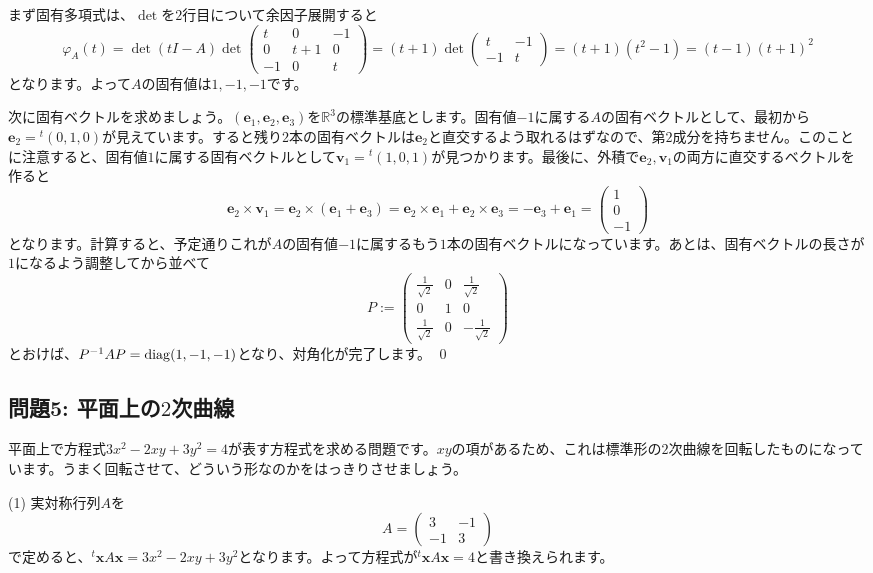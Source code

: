 まず固有多項式は、$\det$を$2$行目について余因子展開すると
\[
\varphi_A(t) = \det(tI - A)
\det
\begin{pmatrix}
t & 0 & -1 \\
0 & t + 1 & 0 \\
-1 & 0 & t 
\end{pmatrix}
=
(t + 1)
\det
\begin{pmatrix}
t & -1 \\
-1 & t 
\end{pmatrix}
= (t + 1)(t^2 - 1)
= (t - 1)(t + 1)^2
\]
となります。よって$A$の固有値は$1, -1, -1$です。

次に固有ベクトルを求めましょう。$(\bm{e}_1, \bm{e}_2, \bm{e}_3)$を$\mathbb{R}^3$の標準基底とします。固有値$-1$に属する$A$の固有ベクトルとして、最初から$\bm{e}_2 = {}^t(0, 1, 0)$が見えています。すると残り$2$本の固有ベクトルは$\bm{e}_2$と直交するよう取れるはずなので、第$2$成分を持ちません。このことに注意すると、固有値$1$に属する固有ベクトルとして$\bm{v}_1 = {}^t(1, 0, 1)$が見つかります。最後に、外積で$\bm{e}_2, \bm{v}_1$の両方に直交するベクトルを作ると
\[
\bm{e}_2 \times \bm{v}_1 = \bm{e}_2 \times (\bm{e}_1 + \bm{e}_3) = \bm{e}_2 \times \bm{e}_1 + \bm{e}_2 \times \bm{e}_3
= -\bm{e}_3 + \bm{e}_1 = 
\begin{pmatrix}
1 \\
0 \\
-1
\end{pmatrix}
\]
となります。計算すると、予定通りこれが$A$の固有値$-1$に属するもう$1$本の固有ベクトルになっています。あとは、固有ベクトルの長さが$1$になるよう調整してから並べて
\[
P := 
\begin{pmatrix}
\frac{1}{\sqrt{2}} & 0 & \frac{1}{\sqrt{2}} \\
0 & 1 & 0 \\
\frac{1}{\sqrt{2}} & 0 & -\frac{1}{\sqrt{2}}
\end{pmatrix}
\]
とおけば、$P^{-1} A P = \operatorname{diag}(1, -1, -1)$となり、対角化が完了します。 \qed

\subsection{問題5: 平面上の$2$次曲線}

平面上で方程式$3x^2 - 2xy + 3y^2 = 4$が表す方程式を求める問題です。$xy$の項があるため、これは標準形の$2$次曲線を回転したものになっています。うまく回転させて、どういう形なのかをはっきりさせましょう。

\noindent (1) 実対称行列$A$を
\[
A =
\begin{pmatrix}
3 & -1 \\
-1 & 3
\end{pmatrix}
\]
で定めると、${}^t\bm{x} A \bm{x} = 3x^2 - 2xy + 3y^2$となります。よって方程式が${}^t\bm{x} A \bm{x} = 4$と書き換えられます。

